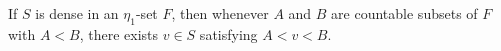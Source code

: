 If $S$ is dense in an $\eta_1$-set $F$, then whenever $A$ and $B$ are countable subsets of $F$ with $A < B$, there exists $v \in S$ satisfying $A < v < B$.